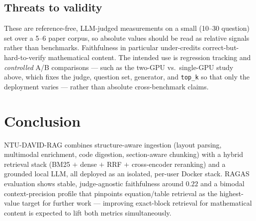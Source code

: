 \documentclass[11pt,a4paper]{article}
\newcommand{\code}[1]{\texttt{\small #1}}
\begin{document}
\subsection{Threats to validity}
These are reference-free, LLM-judged measurements on a small (10--30 question)
set over a 5--6 paper corpus, so absolute values should be read as relative
signals rather than benchmarks. Faithfulness in particular under-credits
correct-but-hard-to-verify mathematical content. The intended use is regression
tracking and \emph{controlled} A/B comparisons --- such as the two-GPU vs.\
single-GPU study above, which fixes the judge, question set, generator, and
\code{top\_k} so that only the deployment varies --- rather than absolute
cross-benchmark claims.

\section{Conclusion}
NTU-DAVID-RAG combines structure-aware ingestion (layout parsing, multimodal
enrichment, code digestion, section-aware chunking) with a hybrid retrieval stack
(BM25 $+$ dense $+$ RRF $+$ cross-encoder reranking) and a grounded local LLM,
all deployed as an isolated, per-user Docker stack. RAGAS evaluation shows stable,
judge-agnostic faithfulness around $0.22$ and a bimodal context-precision profile
that pinpoints equation/table retrieval as the highest-value target for further
work — improving exact-block retrieval for mathematical content is expected to
lift both metrics simultaneously.
\end{document}
